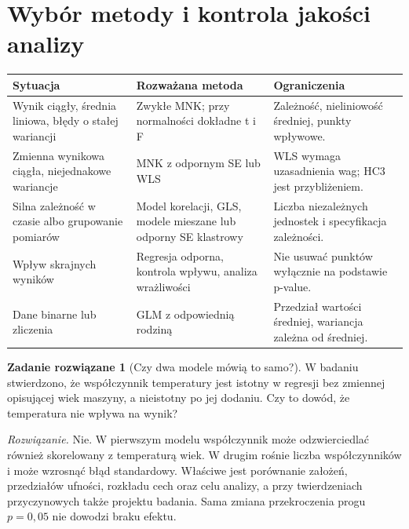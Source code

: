 \documentclass[11pt,a4paper,oneside]{report}
\numberwithin{equation}{chapter}
\theoremstyle{plain}
\theoremstyle{definition}
\newtheorem{zadanie}{Zadanie rozwiązane}[chapter]
\theoremstyle{remark}
\begin{document}
\section{Wybór metody i kontrola jakości analizy}
\begin{center}\small
\begin{tabular}{>{\raggedright\arraybackslash}p{}>{\raggedright\arraybackslash}p{}>{\raggedright\arraybackslash}p{}}
\toprule
\textbf{Sytuacja} & \textbf{Rozważana metoda} & \textbf{Ograniczenia}\\
\midrule
Wynik ciągły, średnia liniowa, błędy o stałej wariancji & Zwykłe MNK; przy normalności dokładne t i F & Zależność, nieliniowość średniej, punkty wpływowe.\\
Zmienna wynikowa ciągła, niejednakowe wariancje & MNK z odpornym SE lub WLS & WLS wymaga uzasadnienia wag; HC3 jest przybliżeniem.\\
Silna zależność w czasie albo grupowanie pomiarów & Model korelacji, GLS, modele mieszane lub odporny SE klastrowy & Liczba niezależnych jednostek i specyfikacja zależności.\\
Wpływ skrajnych wyników & Regresja odporna, kontrola wpływu, analiza wrażliwości & Nie usuwać punktów wyłącznie na podstawie p-value.\\
Dane binarne lub zliczenia & GLM z odpowiednią rodziną & Przedział wartości średniej, wariancja zależna od średniej.\\
\bottomrule
\end{tabular}
\end{center}

\begin{zadanie}[Czy dwa modele mówią to samo?]
W badaniu stwierdzono, że współczynnik temperatury jest
istotny w regresji bez zmiennej opisującej wiek maszyny,
a nieistotny po jej dodaniu. Czy to dowód, że temperatura
nie wpływa na wynik?
\par\emph{Rozwiązanie.} Nie. W pierwszym modelu współczynnik
może odzwierciedlać również skorelowany z temperaturą wiek.
W drugim rośnie liczba współczynników i może wzrosnąć
błąd standardowy. Właściwe jest porównanie założeń,
przedziałów ufności, rozkładu cech oraz celu analizy,
a przy twierdzeniach przyczynowych także projektu badania.
Sama zmiana przekroczenia progu $p=0{,}05$ nie dowodzi
braku efektu.
\end{zadanie}

\end{document}
